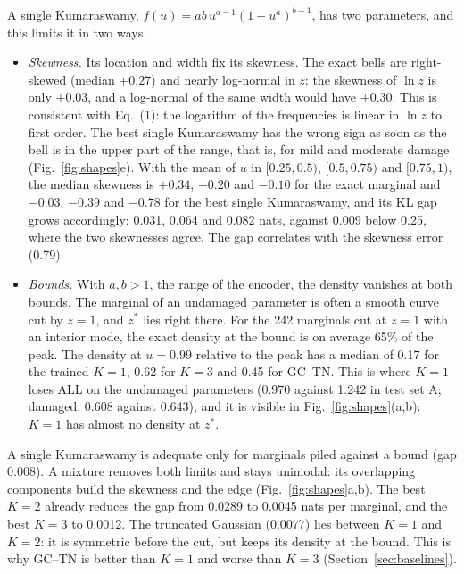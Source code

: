 \documentclass[11pt]{article}
\begin{document}
A single Kumaraswamy, $f(u)=ab\,u^{a-1}(1-u^a)^{b-1}$, has two parameters, and this limits it in two ways.
\begin{itemize}
\item \emph{Skewness.} Its location and width fix its skewness. The exact bells are right-skewed (median $+0.27$) and
nearly log-normal in $z$: the skewness of $\ln z$ is only $+0.03$, and a log-normal of the same width would have $+0.30$.
This is consistent with Eq.~(1): the logarithm of the frequencies is linear in $\ln z$ to first order. The best single
Kumaraswamy has the wrong sign as soon as the bell is in the upper part of the range, that is, for mild and moderate
damage (Fig.~\ref{fig:shapes}e). With the mean of $u$ in $[0.25,0.5)$, $[0.5,0.75)$ and $[0.75,1)$, the median skewness is
$+0.34$, $+0.20$ and $-0.10$ for the exact marginal and $-0.03$, $-0.39$ and $-0.78$ for the best single Kumaraswamy, and
its KL gap grows accordingly: 0.031, 0.064 and 0.082 nats, against 0.009 below 0.25, where the two skewnesses agree. The gap
correlates with the skewness error (0.79).
\item \emph{Bounds.} With $a,b>1$, the range of the encoder, the density vanishes at both bounds. The marginal of an
undamaged parameter is often a smooth curve cut by $z=1$, and $z^*$ lies right there. For the 242 marginals cut at $z=1$
with an interior mode, the exact density at the bound is on average 65\% of the peak. The density at $u=0.99$
relative to the peak has a median of 0.17 for the trained $K=1$, 0.62 for $K=3$ and 0.45 for GC--TN. This is where $K=1$
loses ALL on the undamaged parameters (0.970 against 1.242 in test set A; damaged: 0.608 against 0.643), and it is
visible in Fig.~\ref{fig:shapes}(a,b): $K=1$ has almost no density at $z^*$.
\end{itemize}
A single Kumaraswamy is adequate only for marginals piled against a bound (gap 0.008). A mixture removes both limits
and stays unimodal: its overlapping components build the skewness and the edge (Fig.~\ref{fig:shapes}a,b). The best
$K=2$ already reduces the gap from 0.0289 to 0.0045 nats per marginal, and the best $K=3$ to 0.0012. The truncated
Gaussian (0.0077) lies between $K=1$ and $K=2$: it is symmetric before the cut, but keeps its density at the bound. This
is why GC--TN is better than $K=1$ and worse than $K=3$ (Section~\ref{sec:baselines}).
\end{document}
